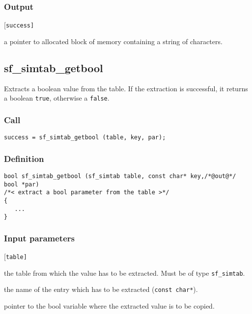 \subsubsection*{Output}
\begin{desclist}{\tt }{\quad}[\tt success]
   \setlength\itemsep{0pt}
   \item[string] a pointer to allocated block of memory containing a string of characters. 
\end{desclist}




\subsection{{sf\_simtab\_getbool}}\label{sec:sf_simtab_getbool}
Extracts a boolean value from the table. If the extraction is successful, it returns a boolean \texttt{true}, otherwise a \texttt{false}.

\subsubsection*{Call}
\begin{verbatim}success = sf_simtab_getbool (table, key, par);\end{verbatim}

\subsubsection*{Definition}
\begin{verbatim}
bool sf_simtab_getbool (sf_simtab table, const char* key,/*@out@*/ bool *par)
/*< extract a bool parameter from the table >*/
{
   ...
}
\end{verbatim}

\subsubsection*{Input parameters}
\begin{desclist}{\tt }{\quad}[\tt table]
   \setlength\itemsep{0pt}
   \item[table] the table from which the value has to be extracted. Must be of type \texttt{sf\_simtab}.
   \item[key]   the name of the entry which has to be extracted (\texttt{const char*}).
   \item[par]   pointer to the bool variable where the extracted value is to be copied.
\end{desclist}

